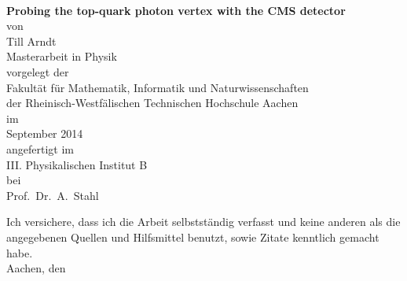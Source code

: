 \documentclass[11pt,twoside,a4paper,headsepline]{scrbook}
\begin{document}
\begin{titlepage}
\thispagestyle{empty}
\begin{center}
   ~ \\
   \vspace{0.2cm}
      {\Huge\bf{Probing the top-quark photon vertex with the CMS detector}\\}
   \vspace{2.0cm}
     von \\
   \vspace{0.5cm}
      {\Large Till Arndt} \\
   \vspace{1.5cm}
      {\Large Masterarbeit in Physik}\\
   \vspace{1.0cm}
     vorgelegt der \\
   \vspace{0.2cm}
      {\Large Fakult\"at f\"ur Mathematik, Informatik und
Naturwissenschaften\\}
      {\Large der Rheinisch-Westf\"alischen Technischen Hochschule
Aachen \\}
   \vspace{1.3cm}
     im \\
   \vspace{0.2cm}
      {\Large September 2014}\\
   \vspace{1.5cm}
      angefertigt im \\
   \vspace{0.3cm}
      {\Large III. Physikalischen Institut B \\}
   \vspace{0.3cm}
      bei\\
   \vspace{0.3cm}
      {\Large Prof.~Dr.~A.~Stahl \\}

\end{center}
\end{titlepage}
Ich versichere, dass ich die Arbeit selbstst\"andig verfasst und keine anderen als die
angegebenen Quellen und Hilfsmittel benutzt, sowie Zitate kenntlich gemacht habe.\\

Aachen, den

\tableofcontents
\newpage
{}











\cleardoublepage
{}




\end{document}
